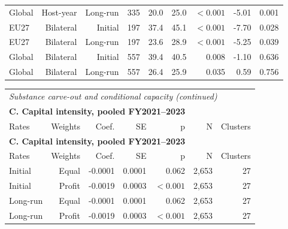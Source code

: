 {\begin{longtable}{@{}lrrrrrrrr@{}}
Global & Host-year & Long-run & 335 & 20.0 & 25.0 & $<0.001$ &  -5.01 & 0.001 \\
EU27 & Bilateral & Initial & 197 & 37.4 & 45.1 & $<0.001$ &  -7.70 & 0.028 \\
EU27 & Bilateral & Long-run & 197 & 23.6 & 28.9 & $<0.001$ &  -5.25 & 0.039 \\
Global & Bilateral & Initial & 557 & 39.4 & 40.5 & 0.008 &  -1.10 & 0.636 \\
Global & Bilateral & Long-run & 557 & 26.4 & 25.9 & 0.035 &   0.59 & 0.756 \\
\end{longtable}
\addtocounter{table}{-1}
\begin{longtable}{@{}lrrrrrr@{}}
\multicolumn{7}{l}{\textit{Substance carve-out and conditional capacity (continued)}} \\
\multicolumn{7}{l}{\textbf{C. Capital intensity, pooled FY2021–2023}} \\
\toprule
Rates & Weights & Coef. & SE & p & N & Clusters \\
\midrule
\endfirsthead
\multicolumn{7}{l}{\textbf{C. Capital intensity, pooled FY2021–2023}} \\
\toprule
Rates & Weights & Coef. & SE & p & N & Clusters \\
\midrule
\endhead
\midrule
\endfoot
\bottomrule
\endlastfoot
Initial & Equal & -0.0001 & 0.0001 & 0.062 & 2,653 & 27 \\
Initial & Profit & -0.0019 & 0.0003 & $<0.001$ & 2,653 & 27 \\
Long-run & Equal & -0.0001 & 0.0001 & 0.062 & 2,653 & 27 \\
Long-run & Profit & -0.0019 & 0.0003 & $<0.001$ & 2,653 & 27 \\
\end{longtable}
\par{}\par
}
